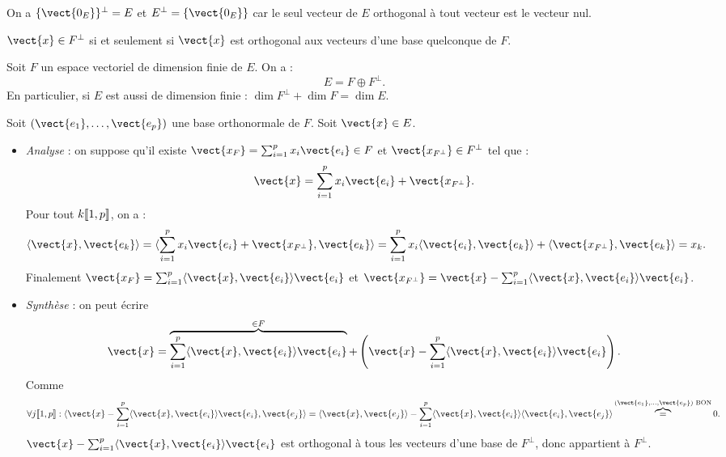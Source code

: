 \documentclass{book}
\begin{document}
\begin{Exemple}
On a $\{\vect{0_E}\}^{\perp}=E$ et $E^{\perp}=\{\vect{0_E}\}$ car le seul vecteur de $E$ orthogonal à tout vecteur est le vecteur nul. 
\end{Exemple}
\begin{Proposition}
$\vect{x}\in F^{\perp}$ si et seulement si $\vect{x}$ est orthogonal aux vecteurs d'une base quelconque de $F$. 
\end{Proposition}

\begin{Proposition}
Soit $F$ un espace vectoriel de dimension finie de $E$. On a :
$$E=F\oplus F^{\perp}.$$
En particulier, si $E$ est aussi de dimension finie : $\dim F^{\perp}+\dim F=\dim E$.\\
\begin{center}
\end{center}
\end{Proposition}
\begin{Demonstration}
Soit $(\vect{e_1},\dots,\vect{e_p})$ une base orthonormale de $F$. Soit $\vect{x}\in E$.
\begin{itemize}
\item  \textit{Analyse} : on suppose qu'il existe $\vect{x_F}=\sum_{i=1}^p x_i \vect{e_i}\in F$ et $\vect{x_{F^{\perp}}}\in F^{\perp}$ tel que :
$$\vect{x} = \sum_{i=1}^p x_i \vect{e_i} + \vect{x_{F^{\perp}}}.$$
Pour tout $k\mathopen\lbrack\!\lbrack1,p \mathclose\rbrack\!\rbrack$, on a :
$$\PS{\vect{x}}{\vect{e_k}} = \PS{\sum_{i=1}^p x_i \vect{e_i} + \vect{x_{F^{\perp}}}}{\vect{e_k}}=\sum_{i=1}^p x_i\PS{ \vect{e_i}}{\vect{e_k}} + \PS{\vect{x_{F^{\perp}}}}{\vect{e_k}}=x_k.$$
Finalement  $\vect{x_F}=\sum_{i=1}^p \PS{\vect{x}}{\vect{e_i}} \vect{e_i}$ et $\vect{x_{F^{\perp}}}=\vect{x}-\sum_{i=1}^p \PS{\vect{x}}{\vect{e_i}} \vect{e_i}$.
\item  \textit{Synthèse} : on peut écrire 
$$\vect{x} =\overbrace{\sum_{i=1}^p \PS{\vect{x}}{\vect{e_i}} \vect{e_i}}^{\in F}+ \left(\vect{x}-\sum_{i=1}^p \PS{\vect{x}}{\vect{e_i}} \vect{e_i}\right).$$
Comme
$$\forall  j\Intf{1}{p}:\PS{\vect{x}-\sum_{i=1}^p \PS{\vect{x}}{\vect{e_i}} \vect{e_i}}{\vect{e_j}} =\PS{\vect{x}}{\vect{e_j}} -\sum_{i=1}^p \PS{\vect{x}}{\vect{e_i}}\PS{ \vect{e_i}}{\vect{e_j}}\overbrace{=}^{(\vect{e_1},\dots,\vect{e_p}) \text{ BON} }0. $$ 
$\vect{x}-\sum_{i=1}^p \PS{\vect{x}}{\vect{e_i}} \vect{e_i}$ est orthogonal à tous les vecteurs d'une base de $F^{\perp}$, donc appartient à  $F^{\perp}$.
\end{itemize}

\end{Demonstration}
\end{document}
